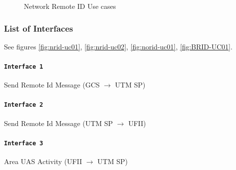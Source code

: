 \documentclass{ua_wgs_base}
\begin{document}
\begin{figure}[p]
\begin{centering}
\par\end{centering}
\caption{Network Remote ID Use cases\label{fig:NRID-UCs}}

\end{figure}


\subsubsection{List of Interfaces\label{sec:interfaces}}

See figures \ref{fig:nrid-uc01}, \ref{fig:nrid-uc02}, \ref{fig:norid-uc01},
\ref{fig:BRID-UC01}.

\paragraph{\texttt{Interface 1}}

Send Remote Id Message (GCS $\rightarrow$ UTM SP) 

\paragraph{\texttt{Interface 2}}

Send Remote Id Message (UTM SP $\rightarrow$ UFII) 

\paragraph{\texttt{Interface 3}}

Area UAS Activity (UFII $\rightarrow$ UTM SP) 
\end{document}
